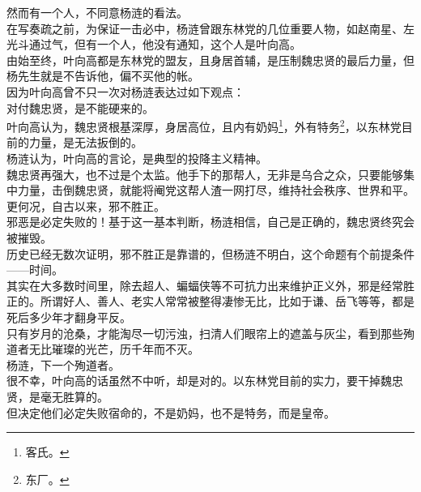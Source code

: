 \begin{multicols}{\theparacolNo}
然而有一个人，不同意杨涟的看法。\\

在写奏疏之前，为保证一击必中，杨涟曾跟东林党的几位重要人物，如赵南星、左光斗通过气，但有一个人，他没有通知，这个人是叶向高。\\

由始至终，叶向高都是东林党的盟友，且身居首辅，是压制魏忠贤的最后力量，但杨先生就是不告诉他，偏不买他的帐。\\

因为叶向高曾不只一次对杨涟表达过如下观点：\\

对付魏忠贤，是不能硬来的。\\

叶向高认为，魏忠贤根基深厚，身居高位，且内有奶妈\footnote{客氏。}，外有特务\footnote{东厂。}，以东林党目前的力量，是无法扳倒的。\\

杨涟认为，叶向高的言论，是典型的投降主义精神。\\

魏忠贤再强大，也不过是个太监。他手下的那帮人，无非是乌合之众，只要能够集中力量，击倒魏忠贤，就能将阉党这帮人渣一网打尽，维持社会秩序、世界和平。\\

更何况，自古以来，邪不胜正。\\

邪恶是必定失败的！基于这一基本判断，杨涟相信，自己是正确的，魏忠贤终究会被摧毁。\\

历史已经无数次证明，邪不胜正是靠谱的，但杨涟不明白，这个命题有个前提条件——时间。\\

其实在大多数时间里，除去超人、蝙蝠侠等不可抗力出来维护正义外，邪是经常胜正的。所谓好人、善人、老实人常常被整得凄惨无比，比如于谦、岳飞等等，都是死后多少年才翻身平反。\\

只有岁月的沧桑，才能淘尽一切污浊，扫清人们眼帘上的遮盖与灰尘，看到那些殉道者无比璀璨的光芒，历千年而不灭。\\

杨涟，下一个殉道者。\\

很不幸，叶向高的话虽然不中听，却是对的。以东林党目前的实力，要干掉魏忠贤，是毫无胜算的。\\

但决定他们必定失败宿命的，不是奶妈，也不是特务，而是皇帝。\\


\end{multicols}
